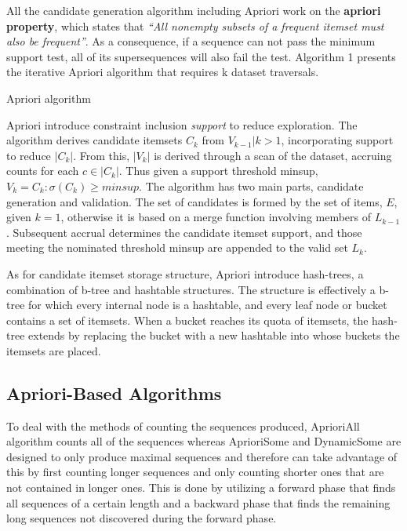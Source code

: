 \documentclass[sigplan, screen]{acmart}
\def\BState{\State\hskip-.5em}
\begin{document}
All the candidate generation algorithm including Apriori work on the \textbf{apriori property}, which states that 
\emph{“All nonempty subsets of a frequent itemset must also be frequent”}. As a consequence, if a sequence can not pass the minimum support test, 
all of its supersequences will also fail the test. Algorithm 1 presents the iterative Apriori algorithm that requires k dataset traversals.
\begin{algorithm}
  \caption{Apriori algorithm}
\end{algorithm}
Apriori introduce constraint inclusion \emph{support} to reduce exploration. The algorithm derives candidate itemsets $C_{k}$ from $V_{k-1} | k > 1$, incorporating support to
reduce $|C_{k}|$. From this, $|V_{k}|$ is derived through a scan of the dataset, accruing counts for each $c \in |C_{k}|$. Thus given a support threshold minsup, $V_{k} = {C_{k} : \sigma(C_{k}) \geq minsup}$.
The algorithm has two main parts, candidate generation and validation. The set of candidates is formed by the set of items, $E$, given $k=1$, 
otherwise it is based on a merge function involving members of $L_{k-1}$. Subsequent accrual determines the candidate itemset support, 
and those meeting the nominated threshold minsup are appended to the valid set $L_{k}$.

As for candidate itemset storage structure, Apriori introduce hash-trees, a combination of b-tree and hashtable structures. The
structure is effectively a b-tree for which every internal node is a hashtable, and every
leaf node or bucket contains a set of itemsets. When a bucket reaches its quota of
itemsets, the hash-tree extends by replacing the bucket with a new hashtable into
whose buckets the itemsets are placed.

\subsection{Apriori-Based Algorithms}
To deal with the methods of counting the sequences produced, AprioriAll algorithm counts all of the sequences whereas AprioriSome
and DynamicSome\cite{agrawal1995mining} are designed to only produce maximal sequences and therefore can
take advantage of this by first counting longer sequences and only counting shorter
ones that are not contained in longer ones. This is done by utilizing a forward phase that
finds all sequences of a certain length and a backward phase that finds the remaining
long sequences not discovered during the forward phase.
\end{document}
